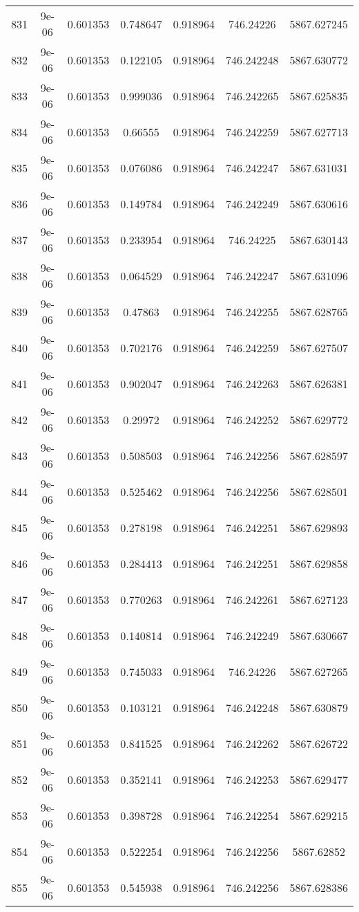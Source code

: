 \begin{table}
\begin{tabular*}{\linewidth}{c|c|c|c|c|c|c}
831 & 9e-06 & 0.601353 & 0.748647 & 0.918964 & 746.24226 & 5867.627245\\
832 & 9e-06 & 0.601353 & 0.122105 & 0.918964 & 746.242248 & 5867.630772\\
833 & 9e-06 & 0.601353 & 0.999036 & 0.918964 & 746.242265 & 5867.625835\\
834 & 9e-06 & 0.601353 & 0.66555 & 0.918964 & 746.242259 & 5867.627713\\
835 & 9e-06 & 0.601353 & 0.076086 & 0.918964 & 746.242247 & 5867.631031\\
836 & 9e-06 & 0.601353 & 0.149784 & 0.918964 & 746.242249 & 5867.630616\\
837 & 9e-06 & 0.601353 & 0.233954 & 0.918964 & 746.24225 & 5867.630143\\
838 & 9e-06 & 0.601353 & 0.064529 & 0.918964 & 746.242247 & 5867.631096\\
839 & 9e-06 & 0.601353 & 0.47863 & 0.918964 & 746.242255 & 5867.628765\\
840 & 9e-06 & 0.601353 & 0.702176 & 0.918964 & 746.242259 & 5867.627507\\
841 & 9e-06 & 0.601353 & 0.902047 & 0.918964 & 746.242263 & 5867.626381\\
842 & 9e-06 & 0.601353 & 0.29972 & 0.918964 & 746.242252 & 5867.629772\\
843 & 9e-06 & 0.601353 & 0.508503 & 0.918964 & 746.242256 & 5867.628597\\
844 & 9e-06 & 0.601353 & 0.525462 & 0.918964 & 746.242256 & 5867.628501\\
845 & 9e-06 & 0.601353 & 0.278198 & 0.918964 & 746.242251 & 5867.629893\\
846 & 9e-06 & 0.601353 & 0.284413 & 0.918964 & 746.242251 & 5867.629858\\
847 & 9e-06 & 0.601353 & 0.770263 & 0.918964 & 746.242261 & 5867.627123\\
848 & 9e-06 & 0.601353 & 0.140814 & 0.918964 & 746.242249 & 5867.630667\\
849 & 9e-06 & 0.601353 & 0.745033 & 0.918964 & 746.24226 & 5867.627265\\
850 & 9e-06 & 0.601353 & 0.103121 & 0.918964 & 746.242248 & 5867.630879\\
851 & 9e-06 & 0.601353 & 0.841525 & 0.918964 & 746.242262 & 5867.626722\\
852 & 9e-06 & 0.601353 & 0.352141 & 0.918964 & 746.242253 & 5867.629477\\
853 & 9e-06 & 0.601353 & 0.398728 & 0.918964 & 746.242254 & 5867.629215\\
854 & 9e-06 & 0.601353 & 0.522254 & 0.918964 & 746.242256 & 5867.62852\\
855 & 9e-06 & 0.601353 & 0.545938 & 0.918964 & 746.242256 & 5867.628386\\
\end{tabular*}
\end{table}
